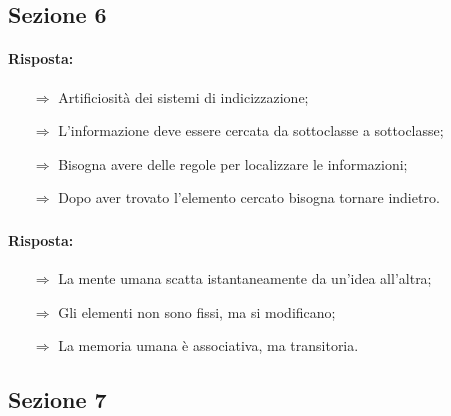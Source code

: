 \subsection{Sezione 6}


\paragraph{Risposta:}

\begin{itemize}
    \item [$\Rightarrow$] Artificiosità dei sistemi di indicizzazione;
    \item [$\Rightarrow$] L'informazione deve essere cercata da sottoclasse a sottoclasse;
    \item [$\Rightarrow$] Bisogna avere delle regole per localizzare le informazioni;
    \item [$\Rightarrow$] Dopo aver trovato l'elemento cercato bisogna tornare indietro.
\end{itemize}

\subsubsection{}


\paragraph{Risposta:} 

\begin{itemize}
    \item [$\Rightarrow$] La mente umana scatta istantaneamente da un'idea all'altra;
    \item [$\Rightarrow$] Gli elementi non sono fissi, ma si modificano;
    \item [$\Rightarrow$] La memoria umana è associativa, ma transitoria.
\end{itemize}

\subsection{Sezione 7}


